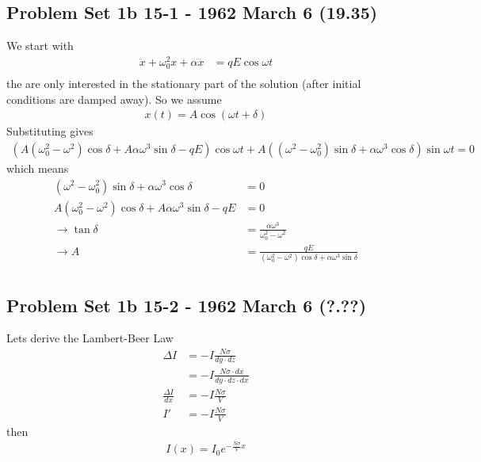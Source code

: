\documentclass[10pt,a4paper]{book}
\theoremstyle{definition}
\begin{document}
\subsection{Problem Set 1b  15-1 - 1962 March 6 (19.35)}
We start with
\begin{align}
\ddot{x}+\omega_0^2x+\alpha\dddot{x}&=qE\cos\omega t\\
\end{align}
the are only interested in the stationary part of the solution (after initial conditions are damped away). So we assume
\begin{align}
x(t)=A\cos(\omega t+\delta)
\end{align}
Substituting gives
\begin{align}
(A(\omega_0^2-\omega^2)\cos\delta+A\alpha\omega^3\sin\delta-qE)\cos\omega t+A((\omega^2-\omega_0^2)\sin\delta+\alpha\omega^3\cos\delta)\sin\omega t=0
\end{align}
which means
\begin{align}
(\omega^2-\omega_0^2)\sin\delta+\alpha\omega^3\cos\delta&=0\\
A(\omega_0^2-\omega^2)\cos\delta+A\alpha\omega^3\sin\delta-qE&=0\\
\rightarrow \tan\delta&=\frac{\alpha\omega^3}{\omega_0^2-\omega^2}\\
\rightarrow A&=\frac{qE}{(\omega_0^2-\omega^2)\cos\delta+\alpha\omega^3\sin\delta}\\
\end{align}



\subsection{Problem Set 1b  15-2 - 1962 March 6 (?.??)}
Lets derive the Lambert-Beer Law
\begin{align}
\Delta I
&=-I \frac{N\sigma}{dy\cdot dz}\\
&=-I \frac{N\sigma\cdot dx}{dy\cdot dz\cdot dx}\\
\frac{\Delta I}{dx}&=-I\frac{N\sigma}{V}\\
I'&=-I\frac{N\sigma}{V}
\end{align}
then
\begin{align}
I(x)=I_0e^{-\frac{N\sigma}{V}x}
\end{align}
\end{document}

